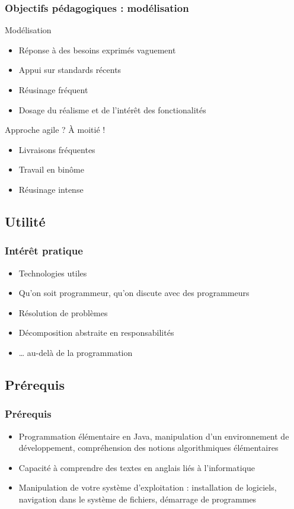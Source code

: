 \documentclass[english, french]{beamer}
\begin{document}
\begin{frame}
	\frametitle{Objectifs pédagogiques : modélisation}
	\begin{block}{Modélisation}
		\begin{itemize}
		\item Réponse à des besoins exprimés vaguement
		\item Appui sur standards récents
		\item Réusinage fréquent
		\item Dosage du réalisme et de l’intérêt des fonctionalités
		\end{itemize}
	\end{block}
	Approche agile ? À moitié !
	\begin{itemize}
		\item Livraisons fréquentes
		\item Travail en binôme
		\item Réusinage intense
	\end{itemize}
\end{frame}

\subsection{Utilité}
\begin{frame}
	\frametitle{Intérêt pratique}
	\begin{itemize}
		\item Technologies utiles
		\item Qu’on soit programmeur, qu’on discute avec des programmeurs
		\item Résolution de problèmes
		\item Décomposition abstraite en responsabilités
		\item … au-delà de la programmation
	\end{itemize}
\end{frame}

\subsection{Prérequis}
\begin{frame}
	\frametitle{Prérequis}
	\begin{itemize}
		\item Programmation élémentaire en Java, manipulation d’un environnement de développement, compréhension des notions algorithmiques élémentaires
		\item Capacité à comprendre des textes en anglais liés à l’informatique
		\item Manipulation de votre système d’exploitation : installation de logiciels, navigation dans le système de fichiers, démarrage de programmes
	\end{itemize}
\end{frame}
\end{document}

